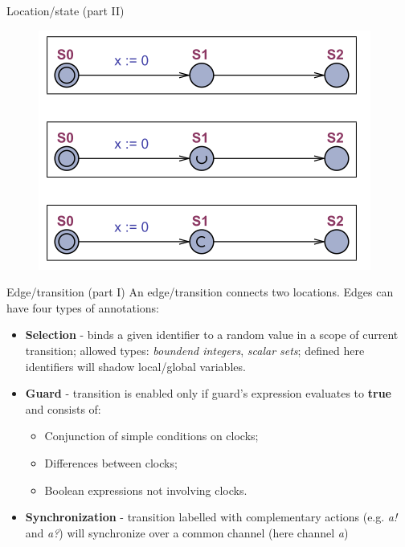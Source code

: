 \documentclass{beamer}
\begin{document}
\begin{frame}{Location/state (part II)}
		\begin{figure}[H]
			\includegraphics[scale=0.8]{img/todo_location_types.png}
		\end{figure}
\end{frame}

\begin{frame}{Edge/transition (part I)}
	An edge/transition connects two locations. Edges can have four types of annotations:
	
	\begin{itemize}
		\item \textbf{Selection} - binds a given identifier to a random value in a scope of current transition; allowed types: \textit{boundend integers}, \textit{scalar sets}; defined here identifiers will shadow local/global variables.
		\item \textbf{Guard} - transition is enabled only if guard's expression evaluates to \textbf{true} and consists of:
		\begin{itemize}
			\item Conjunction of simple conditions on clocks;
			\item Differences between clocks;
			\item Boolean expressions not involving clocks.
		\end{itemize}
		\item \textbf{Synchronization} - transition labelled with complementary actions (e.g. \textit{a!} and \textit{a?}) will synchronize over a common channel (here channel \textit{a})
	\end{itemize}

\end{frame}
\end{document}
